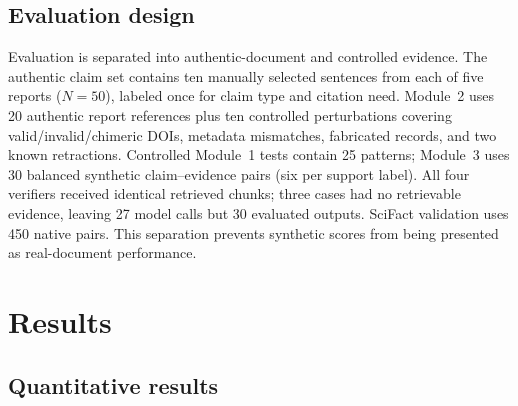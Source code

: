 \documentclass[12pt,toc=bib,toc=listof]{scrartcl}
\begin{document}
\subsection{Evaluation design}

Evaluation is separated into authentic-document and controlled evidence. The authentic claim set contains ten manually selected sentences from each of five reports ($N=50$), labeled once for claim type and citation need. Module~2 uses 20 authentic report references plus ten controlled perturbations covering valid/invalid/chimeric DOIs, metadata mismatches, fabricated records, and two known retractions. Controlled Module~1 tests contain 25 patterns; Module~3 uses 30 balanced synthetic claim--evidence pairs (six per support label). All four verifiers received identical retrieved chunks; three cases had no retrievable evidence, leaving 27 model calls but 30 evaluated outputs. SciFact validation uses 450 native pairs. This separation prevents synthetic scores from being presented as real-document performance.

\section{Results}

\subsection{Quantitative results}
\end{document}
